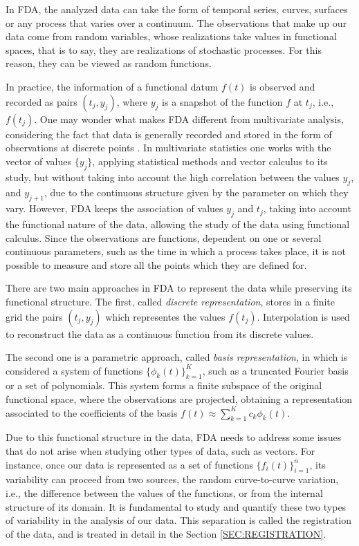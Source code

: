 In \acs{FDA}, the analyzed data can take the form of temporal series, curves,
surfaces or any process that varies over a continuum. The observations that
make up our data come from random variables, whose realizations take
values in functional spaces, that is to say, they are realizations of
stochastic processes. For this reason, they can be viewed as random functions.

In practice, the information of a functional datum $f(t)$ is observed and
recorded as pairs $(t_j, y_j)$, where $y_j$ is a snapshot of the
function $f$ at $t_j$, i.e., $f(t_j)$.
One may wonder what makes \acs{FDA} different from multivariate analysis, considering
the fact that data is generally recorded and stored in the form of
observations at discrete points \cite{Srivastava2016}.
In multivariate statistics one works with the vector of values $\{y_j\}$,
applying statistical methods and vector calculus to its study,
but without taking into account the high correlation between the values
$y_j$, and $y_{j+1}$, due to the continuous structure given by the parameter on
which they vary.
However, \acs{FDA} keeps the association of
values ${y_j}$ and ${t_j}$, taking into account the functional nature of the
data, allowing the study of the data using functional calculus.
Since the observations are functions, dependent on one or several continuous
parameters, such as the time in which a process takes place, it is not
possible to measure and store all the points which they are defined for.

There are two main approaches in \acs{FDA} to represent the data while preserving its
functional structure. The first, called \textit{discrete representation}, stores
in a finite grid the pairs $(t_j, y_j)$ which representes the values $f(t_j)$.
Interpolation is used to reconstruct the data as a continuous function from its discrete values.

The second one is a parametric approach, called \textit{basis representation},
in which is considered a system of functions $\{\phi_k(t) \}_{k=1}^K$, such as a
truncated Fourier basis or a set of polynomials. This system forms a finite
subspace of the original functional space, where the
observations are projected, obtaining a representation associated to the
coefficients of the basis $f(t) \approx \sum_{k=1}^K c_k\phi_k(t)$.

Due to this functional structure in the data,
\acs{FDA} needs to address some issues that do not arise when studying other types of
data, such as vectors.
For instance, once our data is represented as a set of functions
$\{f_i(t)\}_{i=1}^{n}$, its variability can proceed from two sources,
the random curve-to-curve variation, i.e., the difference between the values of
the functions, or from the internal structure of its domain.
It is fundamental to study and quantify these two types of variability in
the analysis of our data. This separation is called the registration of the data,
and is treated in detail in the Section \ref{SEC:REGISTRATION}.

